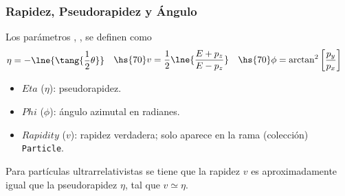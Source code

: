         \subsubsection{Rapidez, Pseudorapidez y Ángulo}
        Los parámetros , ,  se definen como
        \begin{equation*}
            \begin{aligned}
                \eta & = -\lne{\tang{\frac{1}{2}\theta}}
            \end{aligned}\hs{70}
            \begin{aligned}
                v & = \frac{1}{2}\lne{\frac{E+p_{z}}{E-p_{z}}}
            \end{aligned}\hs{70}
            \begin{aligned}
                \phi & = \arctan^{2}\left[\frac{p_{y}}{p_{x}}\right]
            \end{aligned}
        \end{equation*}
        \begin{itemize}
            \item $Eta$ ($\eta$): pseudorapidez.
            \item $Phi$ ($\phi$): ángulo azimutal en radianes.
            \item $Rapidity$ ($v$): rapidez verdadera; solo aparece en la rama (colección) \texttt{Particle}.
        \end{itemize}
        Para partículas ultrarrelativistas se tiene que la rapidez $v$ es aproximadamente igual que la pseudorapidez $\eta$, tal que $v\simeq\eta$.

